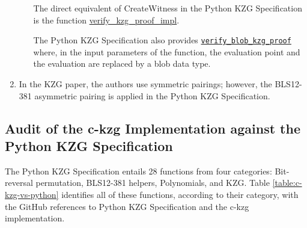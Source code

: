 \documentclass[12pt]{galois-whitepaper}
\begin{document}
\begin{enumerate}
\begin{enumerate}
    The direct equivalent of  \textsf{CreateWitness} in the Python KZG Specification is the function \href{https://github.com/ethereum/consensus-specs/blob/dev/specs/deneb/polynomial-commitments.md\#verify_kzg_proof_impl}{verify\_kzg\_proof\_impl}.

    The Python KZG Specification also provides \href{https://github.com/ethereum/c-kzg-4844/blob/main/src/eip4844/eip4844.c\#L551}{\texttt{verify\_blob\_kzg\_proof}} where, in the input parameters of the function, the evaluation point and the evaluation are replaced by a blob data type.

    \end{enumerate}


    \item In the KZG paper, the authors use symmetric pairings; however, the BLS12-381 asymmetric pairing is applied in the Python KZG Specification.
\end{enumerate}

\subsection{Audit of the c-kzg Implementation against the Python KZG Specification}

The Python KZG Specification entails 28 functions from four categories:
Bit-reversal permutation, BLS12-381 helpers, Polynomials, and KZG.
Table \ref{table:c-kzg-vs-python} identifies all of these functions, according to their category,
with the GitHub references to Python KZG Specification and the c-kzg implementation.
\end{document}
